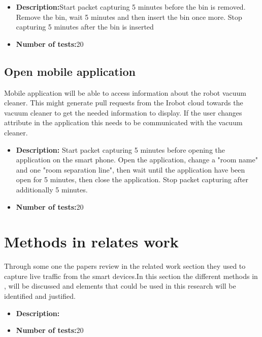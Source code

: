 \begin{itemize}
    \item \textbf{Description:}Start packet capturing 5 minutes before the bin is removed. Remove the bin, wait 5 minutes and then insert the bin once more. Stop capturing 5 minutes after the bin is inserted
    \item \textbf{Number of tests:}20
\end{itemize}

\subsection{Open mobile application}
Mobile application will be able to access information about the robot vacuum cleaner. This might generate pull requests from the Irobot cloud towards the vacuum cleaner to get the needed information to display. If the user changes attribute in the application this needs to be communicated with the vacuum cleaner. 
\begin{itemize}
    \item \textbf{Description:} Start packet capturing 5 minutes before opening the application on the smart phone. Open the application, change a "room name" and one "room separation line", then wait until the application have been open for 5 minutes, then close the application. Stop packet capturing after additionally 5 minutes. 
    \item \textbf{Number of tests:}20
\end{itemize}



\section{Methods in relates work}
Through some one the papers review in the related work section they used to capture live traffic from the smart devices.In this section the different methods in \cite{lindaeavesdropping} \cite{eavsIoT} \cite{Neato}, will be discussed and elements that could be used in this research will be identified and justified. 


\begin{itemize}
    \item \textbf{Description:}
    \item \textbf{Number of tests:}20
\end{itemize}